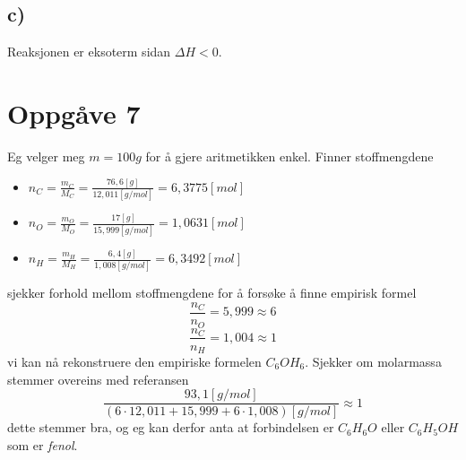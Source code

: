 \documentclass[12pt,a4paper]{article}
\begin{document}
    \subsection*{c)}
    Reaksjonen er eksoterm sidan $\Delta H < 0$.


  \section*{Oppgåve 7}
    Eg velger meg $m = 100g$ for å gjere aritmetikken enkel. Finner stoffmengdene
    \begin{itemize}
      \item $n_C = \frac{m_C}{M_C} = \frac{76,6[g]}{12,011[g/mol]} = 6,3775[mol]$
      \item $n_O = \frac{m_O}{M_O} = \frac{17[g]}{15,999[g/mol]} = 1,0631[mol]$
      \item $n_H = \frac{m_H}{M_H} = \frac{6,4[g]}{1,008[g/mol]} = 6,3492[mol]$
    \end{itemize}
    sjekker forhold mellom stoffmengdene for å forsøke å finne empirisk formel
    \begin{equation}
      \frac{n_C}{n_O} = 5,999 \approx 6
    \end{equation}
    \begin{equation}
      \frac{n_C}{n_H} = 1,004 \approx 1
    \end{equation}
    vi kan nå rekonstruere den empiriske formelen $C_6OH_6$. Sjekker om molarmassa
    stemmer overeins med referansen
    \begin{equation}
      \frac{93,1[g/mol]}{(6\cdot12,011 + 15,999 + 6\cdot 1,008)[g/mol]} \approx 1
    \end{equation}
    dette stemmer bra, og eg kan derfor anta at forbindelsen er $C_6H_6O$ eller
    $C_6H_5OH$ som er \textit{fenol}.
\end{document}
